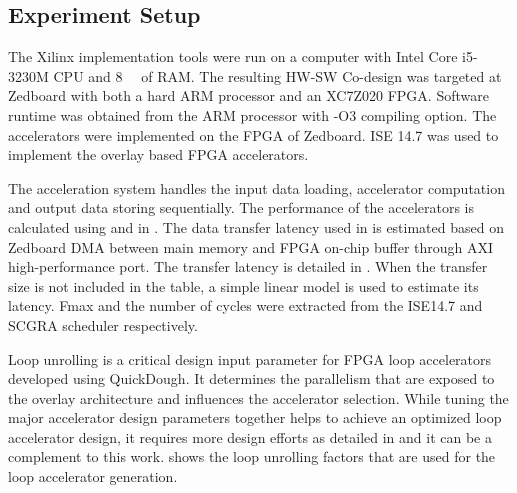 \subsection{Experiment Setup} \label{subsec:setup}
The Xilinx implementation tools were run on a computer with Intel Core i5-3230M CPU and
\SI{8}{\giga\byte} of RAM. The resulting HW-SW Co-design was targeted at 
Zedboard with both a hard ARM processor and an XC7Z020 FPGA. Software runtime was obtained 
from the ARM processor with -O3 compiling option. The accelerators were implemented on 
the FPGA of Zedboard. ISE 14.7 was used to implement the overlay based FPGA accelerators. 

The acceleration system handles the input data loading, accelerator computation and output data
storing sequentially. The performance of the accelerators is calculated using 
and  in . The data transfer latency used in
 is estimated based on Zedboard DMA between main memory and FPGA on-chip buffer
through AXI high-performance port. The
transfer latency is detailed in . When the transfer size is not included in the
table, a simple linear model is used to estimate its latency. Fmax and the number of cycles were
extracted from the ISE14.7 and SCGRA scheduler respectively. 
 
\begin{table}
    \centering
    \caption{DMA transfer latency on Zedboard through AXI high performance port \label{tab:latency}}{
        \centering
    }
\end{table}

Loop unrolling is a critical design input parameter for FPGA loop accelerators developed using QuickDough. It determines the parallelism that are exposed to the overlay architecture and influences the accelerator selection. While tuning the major accelerator design parameters together helps to achieve an optimized loop accelerator design, it requires more design efforts as detailed in \cite{scgra-customization} and it can be a complement to this work.  shows the loop unrolling factors that are used for the loop accelerator generation.

